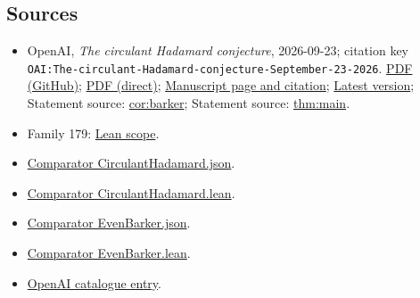 \documentclass[11pt]{article}
\begin{document}
\subsection{Sources}
\begin{itemize}
\item OpenAI, \emph{The circulant Hadamard conjecture}, 2026-09-23; citation key \texttt{OAI:The-circulant-Hadamard-conjecture-September-23-2026}. \href{https://github.com/openai/math/blob/adc7f1241b42e322a6451854ab7e4b4c146bf78a/preprints/The-circulant-Hadamard-conjecture-September-23-2026/paper.pdf}{PDF (GitHub)}; \href{https://github.com/openai/math/raw/adc7f1241b42e322a6451854ab7e4b4c146bf78a/preprints/The-circulant-Hadamard-conjecture-September-23-2026/paper.pdf}{PDF (direct)}; \href{https://github.com/openai/math/blob/adc7f1241b42e322a6451854ab7e4b4c146bf78a/preprints/The-circulant-Hadamard-conjecture-September-23-2026/README.md}{Manuscript page and citation}; \href{https://github.com/openai/math/blob/main/preprints/The-circulant-Hadamard-conjecture-September-23-2026/paper.pdf}{Latest version}; Statement source: \href{https://github.com/openai/math/blob/adc7f1241b42e322a6451854ab7e4b4c146bf78a/preprints/The-circulant-Hadamard-conjecture-September-23-2026/build/sections/introduction.tex\#L43}{cor:barker}; Statement source: \href{https://github.com/openai/math/blob/adc7f1241b42e322a6451854ab7e4b4c146bf78a/preprints/The-circulant-Hadamard-conjecture-September-23-2026/build/sections/introduction.tex\#L21}{thm:main}.
\item Family 179: \href{https://github.com/openai/math/blob/adc7f1241b42e322a6451854ab7e4b4c146bf78a/lean/docs/179.md}{Lean scope}.
\item \href{https://github.com/openai/math/blob/adc7f1241b42e322a6451854ab7e4b4c146bf78a/lean/ComparatorChallenges/CirculantHadamard.json}{Comparator CirculantHadamard.json}.
\item \href{https://github.com/openai/math/blob/adc7f1241b42e322a6451854ab7e4b4c146bf78a/lean/ComparatorChallenges/CirculantHadamard.lean}{Comparator CirculantHadamard.lean}.
\item \href{https://github.com/openai/math/blob/adc7f1241b42e322a6451854ab7e4b4c146bf78a/lean/ComparatorChallenges/EvenBarker.json}{Comparator EvenBarker.json}.
\item \href{https://github.com/openai/math/blob/adc7f1241b42e322a6451854ab7e4b4c146bf78a/lean/ComparatorChallenges/EvenBarker.lean}{Comparator EvenBarker.lean}.
\item \href{https://github.com/openai/math/blob/adc7f1241b42e322a6451854ab7e4b4c146bf78a/CONTENTS.md}{OpenAI catalogue entry}.
\end{itemize}
\end{document}
